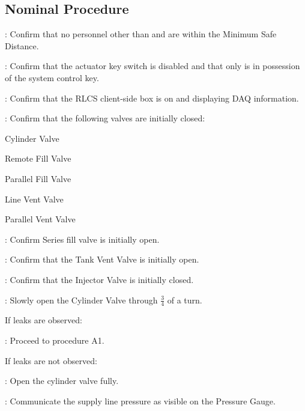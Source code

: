 \subsection{Nominal Procedure}
\begin{checklist}
    \item \secondary: Confirm that no personnel other than \primary{} and \secondary{} are within the Minimum Safe Distance.
    \item \ops: Confirm that the actuator key switch is disabled and that only \ops{} is in possession of the system control  key.
    \item \control: Confirm that the RLCS client-side box is on and displaying DAQ information.
    \item \primary{}: Confirm that the following valves are initially closed:
    \begin{checklist}
        \item Cylinder Valve
        \item Remote Fill Valve
        \item Parallel Fill Valve
        \item Line Vent Valve
        \item Parallel Vent Valve
    \end{checklist}
    \item \primary{}: Confirm Series fill valve is initially open.
    \item \control{}: Confirm that the Tank Vent Valve is initially open.
    \item \control{}: Confirm that the Injector Valve is initially closed.
    \item \primary: Slowly open the Cylinder Valve through $\frac{3}{4}$ of a turn.
    \begin{checklist}[label=$\bullet$]
        \item If leaks are observed:
        \begin{checklist}
            \item \ops{}: Proceed to procedure A1.
        \end{checklist}
        \item If leaks are not observed:
        \begin{checklist}
            \item \primary{}: Open the cylinder valve fully.
        \end{checklist}
    \end{checklist}
    \item \primary{}: Communicate the supply line pressure as visible on the Pressure Gauge.

\end{checklist}
